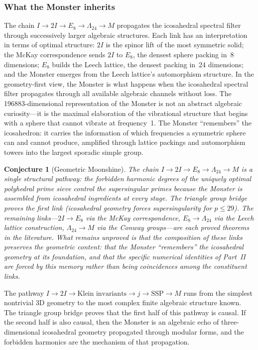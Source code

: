 \documentclass[11pt,letterpaper]{article}
\newtheorem{conjecture}[theorem]{Conjecture}
\theoremstyle{definition}
\newcommand{\SSP}{\mathrm{SSP}}
\begin{document}
\subsubsection*{What the Monster inherits}
The chain $I\to 2I\to E_8\to\Lambda_{24}\to M$ propagates the icosahedral spectral filter through successively larger algebraic structures.  Each link has an interpretation in terms of optimal structure: $2I$ is the spinor lift of the most symmetric solid; the McKay correspondence sends $2I$ to $E_8$, the densest sphere packing in~8 dimensions; $E_8$ builds the Leech lattice, the densest packing in~24 dimensions; and the Monster emerges from the Leech lattice's automorphism structure.
In the geometry-first view, the Monster is what happens when the icosahedral spectral filter propagates through all available algebraic channels without loss.  The 196883-dimensional representation of the Monster is not an abstract algebraic curiosity---it is the maximal elaboration of the vibrational structure that begins with a sphere that cannot vibrate at frequency~1.  The Monster ``remembers'' the icosahedron: it carries the information of which frequencies a symmetric sphere can and cannot produce, amplified through lattice packings and automorphism towers into the largest sporadic simple group.
\begin{conjecture}[Geometric Moonshine]\label{conj:moonshine}
The chain $I\to 2I\to E_8\to\Lambda_{24}\to M$ is a single structural pathway: the forbidden harmonic degrees of the uniquely optimal polyhedral prime sieve control the supersingular primes because the Monster is assembled from icosahedral ingredients at every stage.  The triangle group bridge proves the first link (icosahedral geometry forces supersingularity for $p\le 29$).  The remaining links---$2I\to E_8$ via the McKay correspondence, $E_8\to\Lambda_{24}$ via the Leech lattice construction, $\Lambda_{24}\to M$ via the Conway groups---are each proved theorems in the literature.  What remains unproved is that the \emph{composition} of these links preserves the geometric content: that the Monster ``remembers'' the icosahedral geometry at its foundation, and that the specific numerical identities of Part~II are forced by this memory rather than being coincidences among the constituent links.
\end{conjecture}
The pathway $I\to 2I\to\text{Klein invariants}\to j\to\SSP\to M$ runs from the simplest nontrivial 3D geometry to the most complex finite algebraic structure known.  The triangle group bridge proves that the first half of this pathway is causal.  If the second half is also causal, then the Monster is an algebraic echo of three-dimensional icosahedral geometry propagated through modular forms, and the forbidden harmonics are the mechanism of that propagation.
\end{document}
